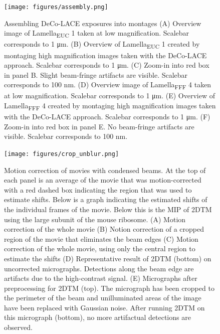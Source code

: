 \documentclass[
]{article}
\newenvironment{fignos:tagged-figure}[1][]{
    \let\oldthefigure\thefigure
    \let\oldtheHfigure\theHfigure
    \renewcommand{\thefigure}{#1}
    \renewcommand{\theHfigure}{#1}
  }{
    \let\thefigure\oldthefigure
    \let\theHfigure\oldtheHfigure
    \addtocounter{figure}{-1}
  }
\begin{document}
\begin{figure}
\hypertarget{fig:assembly}{%
\centering
\texttt{[image: figures/assembly.png]}
\caption{Assembling DeCo-LACE exposures into montages (A) Overview image of
Lamella\textsubscript{EUC} 1 taken at low magnification. Scalebar corresponds to 1 μm.
(B) Overview of Lamella\textsubscript{EUC} 1 created by montaging high magnification
images taken with the DeCo-LACE approach. Scalebar corresponds to 1 μm.
(C) Zoom-in into red box in panel B. Slight beam-fringe artifacts are
visible. Scalebar corresponds to 100 nm. (D) Overview image of
Lamella\textsubscript{FFF} 4 taken at low magnification. Scalebar corresponds to 1 μm.
(E) Overview of Lamella\textsubscript{FFF} 4 created by montaging high magnification
images taken with the DeCo-LACE approach. Scalebar corresponds to 1 μm.
(F) Zoom-in into red box in panel E. No beam-fringe artifacts are
visible. Scalebar corresponds to 100
nm.}\label{fig:assembly}
}
\end{figure}

\begin{fignos:tagged-figure}

\begin{figure}
\hypertarget{fig:crop_unblur}{%
\centering
\texttt{[image: figures/crop\_unblur.png]}
\caption{Motion correction of movies with condensed beams. At the top of each
panel is an average of the movie that was motion-corrected with a red
dashed box indicating the region that was used to estimate shifts. Below
is a graph indicating the estimated shifts of the individual frames of
the movie. Below this is the MIP of 2DTM using the large subunit of the
mouse ribosome. (A) Motion correction of the whole movie (B) Notion
correction of a cropped region of the movie that eliminates the beam
edges (C) Motion correction of the whole movie, using only the central
region to estimate the shifts (D) Representative result of 2DTM (bottom)
on uncorrected micrographs. Detections along the beam edge are artifacts
due to the high-contrast signal. (E) Micrographs after preprocessing for
2DTM (top). The micrograph has been cropped to the perimeter of the beam
and unilluminated areas of the image have been replaced with Gaussian
noise. After running 2DTM on this micrograph (bottom), no more
artifactual detections are
observed.}\label{fig:crop_unblur}
}
\end{figure}

\end{fignos:tagged-figure}
\end{document}
